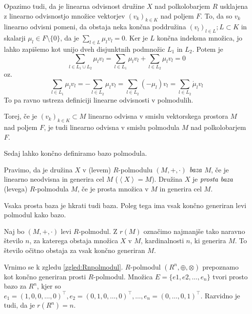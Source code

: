 \documentclass[mat1]{fmfdelo}
\newcommand{\pojem}[1]{\ensuremath{\emph{#1}}}
\newcommand{\Gen}[1]{\ensuremath{\left<{#1}\right>}}
\begin{document}
Opazimo tudi, da je linearna odvisnost družine $X$ nad polkolobarjem $R$ usklajena z linearno odvisnostjo množice vektorjev $(v_k)_{k\in K}$ nad poljem $F$.
To, da so $v_k$ linearno odvisni pomeni, da obstaja neka končna poddružina $(v_l)_{l\in L}; L\subset K$ in skalarji $\mu_l\in F\setminus\{0\}$, da je $\sum_{l\in L}\mu_lv_l = 0$. Ker je $L$ končna indeksna množica, jo lahko zapišemo kot unijo dveh disjunktnih podmnožic $L_1$ in $L_2$. Potem je $$ \sum_{l\in L_1\cup L_2} \mu_lv_l = \sum_{l\in L_1}\mu_lv_l + \sum_{l\in L_2}\mu_lv_l = 0$$ oz. $$\sum_{l\in L_1}\mu_lv_l = - \sum_{l\in L_2}\mu_lv_l = \sum_{l\in L_2} (-\mu_l)v_l = \sum_{l\in L_2}\acute{\mu}_lv_l $$
To pa ravno ustreza definiciji linearne odvisnosti v polmodulih. 

Torej, če je $(v_k)_{k\in K} \subset M$ linearno odvisna v smislu vektorskega prostora $M$ nad poljem $F$, je tudi linearno odvisna v smislu polmodula $M$ nad polkolobarjem $F$.

Sedaj lahko končno definiramo bazo polmodula.

\begin{definicija}
	Pravimo, da je družina $X$ v (levem) $R$-polmodulu $(M, +, \cdot)$ \pojem{baza} $M$, če je linearno neodvisna in generira cel $M$ ($\Gen{X} = M$). Družina $X$ je \pojem{prosta baza} (levega) $R$-polmodula $M$, če je prosta množica v $M$ in generira cel $M$.
\end{definicija}

\begin{opomba}
	Vsaka prosta baza je hkrati tudi baza. Poleg tega ima vsak končno generiran levi polmodul kako bazo.
\end{opomba}

\begin{definicija}
	Naj bo $(M, +, \cdot)$ levi $R$-polmodul. Z $r(M)$ označimo najmanjše tako naravno število $n$, za katerega obstaja množica $X$ v $M$, kardinalnosti $n$, ki generira $M$. To število očitno obstaja za vsak končno generiran $M$.
\end{definicija}

\begin{zgled}
	Vrnimo se k zgledu \ref{zgled:Rnpolmodul}. $R$-polmodul $(R^n, \oplus, \otimes)$ prepoznamo kot končno generiran prosti $R$-polmodul. Množica $E = \{e1, e2, \ldots, e_n\}$ tvori prosto bazo za $R^n$, kjer so $e_1 = (1, 0, 0, \ldots, 0)^\top, e_2 = (0, 1, 0, \ldots, 0)^\top, \ldots, e_n = (0, \ldots, 0, 1)^\top$. Razvidno je tudi, da je $r(R^n) = n$.
\end{zgled}
\end{document}
